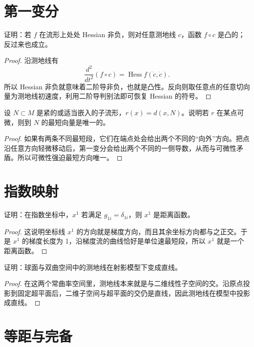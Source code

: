 \documentclass[11pt,a4paper,openany]{ctexbook}
\numberwithin{equation}{chapter}
\begin{document}
\section{第一变分}

\begin{problem}
证明：若 \(f\) 在流形上处处 Hessian 非负，则对任意测地线 \(c\)，函数 \(f\circ c\) 是凸的；反过来也成立。
\end{problem}
\begin{proof}
沿测地线有
\[
\frac{d^2}{dt^2}(f\circ c)=\operatorname{Hess}f(\dot c,\dot c).
\]
所以 Hessian 非负就意味着二阶导非负，也就是凸性。反向则取任意点的任意切向量为测地线初速度，利用二阶导判别法即可恢复 Hessian 的符号。
\end{proof}

\begin{problem}
设 \(N\subset M\) 是紧的或适当嵌入的子流形，\(r(x)=d(x,N)\)。说明若 \(r\) 在某点可微，则到 \(N\) 的最短向量是唯一的。
\end{problem}
\begin{proof}
如果有两条不同最短段，它们在端点处会给出两个不同的“向外”方向。把点沿任意方向轻微移动后，第一变分会给出两个不同的一侧导数，从而与可微性矛盾。所以可微性强迫最短方向唯一。
\end{proof}

\section{指数映射}

\begin{problem}
证明：在指数坐标中，\(x^1\) 若满足 \(g_{1i}=\delta_{1i}\)，则 \(x^1\) 是距离函数。
\end{problem}
\begin{proof}
这说明坐标线 \(x^1\) 的方向就是梯度方向，而且其余坐标方向都与之正交。于是 \(x^1\) 的梯度长度为 1，沿梯度流的曲线恰好是单位速最短段，所以 \(x^1\) 就是一个距离函数。
\end{proof}

\begin{problem}
证明：球面与双曲空间中的测地线在射影模型下变成直线。
\end{problem}
\begin{proof}
在这两个常曲率空间里，测地线本来就是与二维线性子空间的交。沿原点投影到固定超平面后，二维子空间与超平面的交仍是直线，因此测地线在模型中投影成直线。
\end{proof}

\section{等距与完备}
\end{document}
